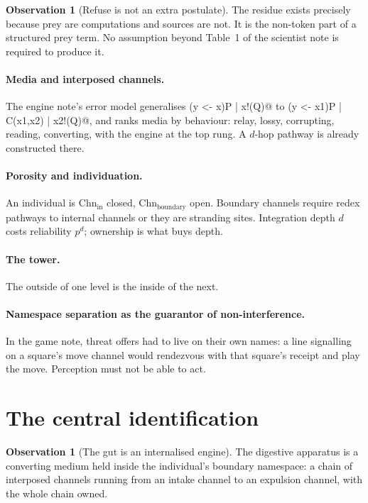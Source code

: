 \documentclass[11pt]{article}
\theoremstyle{plain}
\theoremstyle{definition}
\newtheorem{observation}[theorem]{Observation}
\newcommand{\Chn}{\mathrm{Chn}}
\begin{document}
\begin{observation}[Refuse is not an extra postulate]
\label{obs:refuse}
The residue exists precisely because prey are computations and sources are not. It is the non-token
part of a structured prey term. No assumption beyond Table~1 of the scientist note is required to
produce it.
\end{observation}

\paragraph{Media and interposed channels.} The engine note's error model generalises
\lstinline@for(y <- x)P | x!(Q)@ to \lstinline@for(y <- x1)P | C(x1,x2) | x2!(Q)@, and ranks media by
behaviour: relay, lossy, corrupting, reading, converting, with the engine at the top rung. A $d$-hop
pathway is already constructed there.

\paragraph{Porosity and individuation.} An individual is $\Chn_{\mathrm{in}}$ closed,
$\Chn_{\mathrm{boundary}}$ open. Boundary channels require redex pathways to internal channels or they
are stranding sites. Integration depth $d$ costs reliability $p^{d}$; ownership is what buys depth.

\paragraph{The tower.} The outside of one level is the inside of the next.

\paragraph{Namespace separation as the guarantor of non-interference.} In the game note, threat offers
had to live on their own names: a line signalling on a square's move channel would rendezvous with
that square's receipt and play the move. Perception must not be able to act.

\section{The central identification}
\label{sec:ident}

\begin{observation}[The gut is an internalised engine]
\label{obs:gut}
The digestive apparatus is a converting medium held inside the individual's boundary namespace: a
chain of interposed channels running from an intake channel to an expulsion channel, with the whole
chain owned.
\end{observation}
\end{document}
